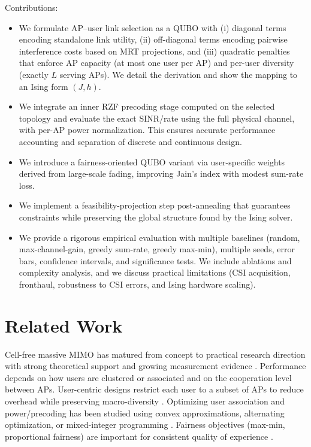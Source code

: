 Contributions:
\begin{itemize}
\item We formulate AP–user link selection as a QUBO with (i) diagonal terms encoding standalone link utility, (ii) off-diagonal terms encoding pairwise interference costs based on MRT projections, and (iii) quadratic penalties that enforce AP capacity (at most one user per AP) and per-user diversity (exactly $L$ serving APs). We detail the derivation and show the mapping to an Ising form $(J,h)$.
\item We integrate an inner RZF precoding stage computed on the selected topology and evaluate the exact SINR/rate using the full physical channel, with per-AP power normalization. This ensures accurate performance accounting and separation of discrete and continuous design.
\item We introduce a fairness-oriented QUBO variant via user-specific weights derived from large-scale fading, improving Jain's index with modest sum-rate loss.
\item We implement a feasibility-projection step post-annealing that guarantees constraints while preserving the global structure found by the Ising solver.
\item We provide a rigorous empirical evaluation with multiple baselines (random, max-channel-gain, greedy sum-rate, greedy max-min), multiple seeds, error bars, confidence intervals, and significance tests. We include ablations and complexity analysis, and we discuss practical limitations (CSI acquisition, fronthaul, robustness to CSI errors, and Ising hardware scaling).
\end{itemize}

\section{Related Work}
Cell-free massive MIMO has matured from concept to practical research direction with strong theoretical support and growing measurement evidence \cite{ngo2017cell,demir2021foundations,bjornson2019massive}. Performance depends on how users are clustered or associated and on the cooperation level between APs. User-centric designs restrict each user to a subset of APs to reduce overhead while preserving macro-diversity \cite{buzzi2019user,chen2020structured}. Optimizing user association and power/precoding has been studied using convex approximations, alternating optimization, or mixed-integer programming \cite{nayebi2017precoding,bjornson2019making}. Fairness objectives (max-min, proportional fairness) are important for consistent quality of experience \cite{bashar2021max}.

